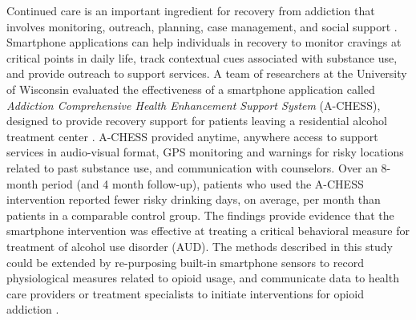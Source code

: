 \documentclass[sigconf]{acmart}
\begin{document}
Continued care is an important ingredient for recovery from addiction that
involves monitoring, outreach, planning, case management, and social support 
\cite{johnson11}. Smartphone applications can help individuals in recovery to 
monitor cravings at critical points in daily life, track contextual cues 
associated with substance use, and provide outreach to support services. A team 
of researchers at the University of Wisconsin evaluated the effectiveness of a
smartphone application called {\em Addiction Comprehensive Health Enhancement 
Support System} (A-CHESS), designed to provide recovery support for patients 
leaving a residential alcohol treatment center \cite{gustafson14}. A-CHESS 
provided anytime, anywhere access to support services in audio-visual format, 
GPS monitoring and warnings for risky locations related to past substance use, 
and communication with counselors. Over an 8-month period (and 4 month follow-up), 
patients who used the A-CHESS intervention reported fewer risky drinking days, 
on average, per month than patients in a comparable control group. The findings 
provide evidence that the smartphone intervention was effective at treating a 
critical behavioral measure for treatment of alcohol use disorder (AUD). The 
methods described in this study could be extended by re-purposing built-in 
smartphone sensors to record physiological measures related to opioid usage, 
and communicate data to health care providers or treatment specialists to 
initiate interventions for opioid addiction \cite{johnson11}. 
\end{document}
